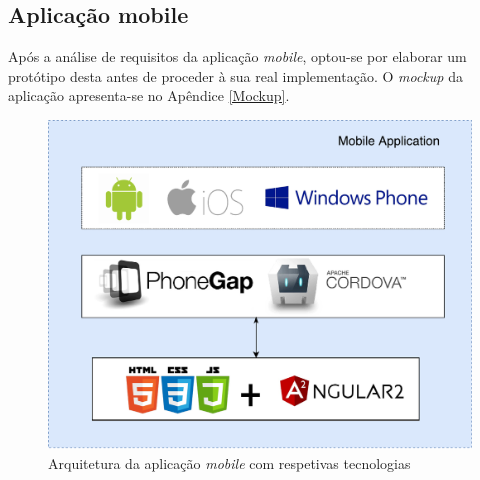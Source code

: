 

















\subsection{Aplicação mobile}


Após a análise de requisitos da aplicação \textit{mobile}, optou-se por elaborar um protótipo desta antes de proceder à sua real implementação. O \textit{mockup} da aplicação apresenta-se no Apêndice \ref{Mockup}. 

\begin{figure}[h]
	\centering
	\includegraphics[scale = 0.4]{esquemas/arquitetura-mobile.pdf}
	\caption{Arquitetura da aplicação \textit{mobile} com respetivas tecnologias}
	\label{arquiteturamobile}
\end{figure}

